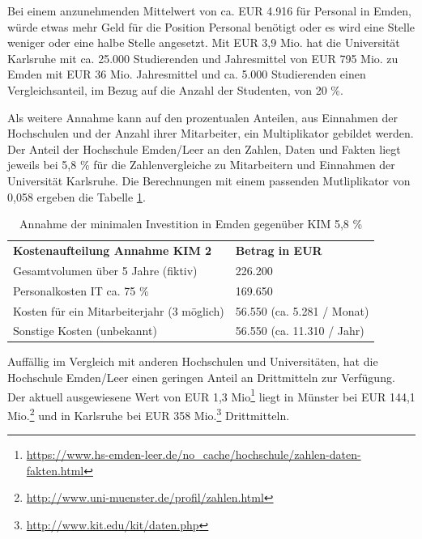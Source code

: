 Bei einem anzunehmenden Mittelwert von ca. EUR 4.916 für Personal in Emden, würde etwas mehr Geld für die Position Personal benötigt oder es wird eine Stelle weniger oder eine halbe Stelle angesetzt. Mit EUR 3,9 Mio. hat die Universität Karlsruhe mit ca. 25.000 Studierenden und Jahresmittel von EUR 795 Mio.  zu Emden mit EUR 36 Mio. Jahresmittel und ca. 5.000 Studierenden einen Vergleichsanteil, im Bezug auf die Anzahl der Studenten, von 20 \%.


Als weitere Annahme kann auf den prozentualen Anteilen, aus Einnahmen der Hochschulen und der Anzahl ihrer Mitarbeiter,
ein Multiplikator gebildet werden. Der Anteil der Hochschule Emden/Leer an den Zahlen, Daten und Fakten liegt jeweils bei 5,8 \%  für die Zahlenvergleiche zu Mitarbeitern und Einnahmen der Universität Karlsruhe. Die Berechnungen mit einem passenden Mutliplikator von 0,058 ergeben die Tabelle \ref{tab_kostenaufteilung_emden_KIM2}.

\begin{table}[h!]
	\begin{tabularx}{\textwidth}{l|l}
		\hline
		\textbf{Kostenaufteilung Annahme KIM 2} & \textbf{Betrag in EUR}\\
		Gesamtvolumen über 5 Jahre (fiktiv) & 226.200\\
		Personalkosten IT ca. 75 \% & 169.650\\
		Kosten für ein Mitarbeiterjahr (3 möglich) & 56.550 (ca. 5.281 / Monat)\\ 
		Sonstige Kosten (unbekannt) & 56.550 (ca. 11.310 / Jahr)\\
		\hline
	\end{tabularx}
	\caption{Annahme der minimalen Investition in Emden gegenüber KIM 5,8 \%}
	\label{tab_kostenaufteilung_emden_KIM2}
\end{table}

\clearpage

Auffällig im Vergleich mit anderen Hochschulen und Universitäten, hat die Hochschule Emden/Leer einen geringen Anteil an Drittmitteln zur Verfügung. Der aktuell ausgewiesene Wert von EUR 1,3 Mio\footnote{\url{https://www.hs-emden-leer.de/no_cache/hochschule/zahlen-daten-fakten.html}} liegt in Münster bei EUR 144,1 Mio.\footnote{\url{http://www.uni-muenster.de/profil/zahlen.html}} und in Karlsruhe bei EUR 358 Mio.\footnote{\url{http://www.kit.edu/kit/daten.php}} Drittmitteln. 

